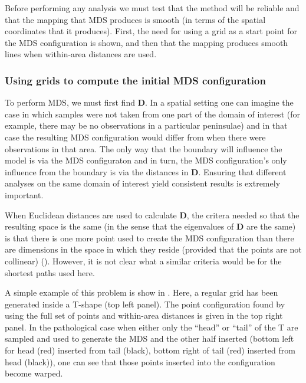 Before performing any analysis we must test that the method will be reliable and that the mapping that MDS produces  is smooth (in terms of the spatial coordinates that it produces). First, the need for using a grid as a start point for the MDS configuration is shown, and then that the mapping produces smooth lines when within-area distances are used.

\subsubsection{Using grids to compute the initial MDS configuration}
\label{grids}

To perform MDS, we must first find $\mathbf{D}$. In a spatial setting one can imagine the case in which samples were not taken from one part of the domain of interest (for example, there may be no observations in a particular peninsulae) and in that case the resulting MDS configuration would differ from when there were observations in that area. The only way that the boundary will influence the model is via the MDS configuraton and in turn, the MDS configuration's only influence from the boundary is via the distances in $\mathbf{D}$. Ensuring that different analyses on the same domain of interest yield consistent results is extremely important. 

When Euclidean distances are used to calculate $\mathbf{D}$, the critera needed so that the resulting space is the same (in the sense that the eigenvalues of $\mathbf{D}$ are the same) is that there is one more point used to create the MDS configuration than there are dimensions in the space in which they reside (provided that the points are not collinear) (\cite{landmark}). However, it is not clear what a similar criteria would be for the shortest paths used here. 

A simple example of this problem is show in . Here, a regular grid has been generated inside a T-shape (top left panel). The point configuration found by using the full set of points and within-area distances is given in the top right panel. In the pathological case when either only the ``head'' or ``tail'' of the T are sampled and used to generate the MDS and the other half inserted (bottom left for head (red) inserted from tail (black), bottom right of tail (red) inserted from head (black)), one can see that those points inserted into the configuration become warped. 

